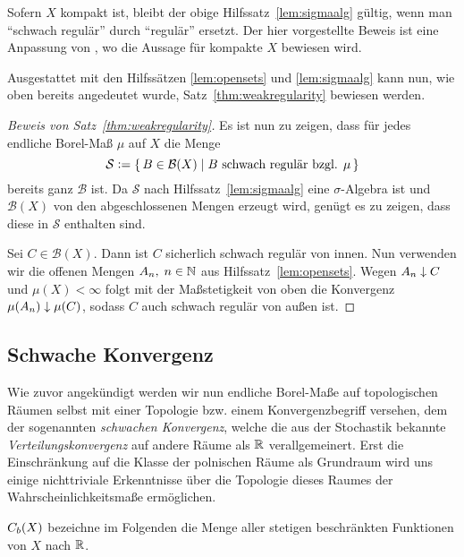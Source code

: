\documentclass[../main/main.tex]{subfiles}
\begin{document}
	\begin{Bemerkung}
		Sofern $X$ kompakt ist, bleibt der obige Hilfssatz~\ref{lem:sigmaalg} 
		gültig, wenn man \enquote{schwach regulär} durch \enquote{regulär} 
		ersetzt. Der hier vorgestellte Beweis ist eine Anpassung von 
		\cite[Lemma 4.5.5]{Simon.2015}, wo die Aussage für kompakte $X$ bewiesen wird.
	\end{Bemerkung}
	
	Ausgestattet mit den Hilfssätzen \ref{lem:opensets} und \ref{lem:sigmaalg} kann nun, 
	wie oben bereits angedeutet wurde, Satz~\ref{thm:weakregularity} bewiesen werden.
	
	\begin{proof}[Beweis von Satz~\ref{thm:weakregularity}]
		Es ist nun zu zeigen, dass für jedes endliche Borel-Maß $\mu$ auf $X$
		die Menge 
		$$\mathcal{S} \vcentcolon = \left\{\, B \in \mathcal{B}(X) \; \middle| \; B \text{ schwach regulär bzgl. } \mu \,\right\}$$
		bereits ganz $\mathcal{B}$ ist. 
		Da $\mathcal{S}$ nach Hilfssatz~\ref{lem:sigmaalg} eine 
		$\sigma$-Algebra ist und 
		$\mathcal{B}(X)$ von den abgeschlossenen Mengen erzeugt wird, genügt es zu zeigen, 
		dass diese in $\mathcal{S}$ enthalten sind. 
		
		Sei $C \in \mathcal{B}(X)$. Dann ist $C$ sicherlich schwach regulär von innen. 
		Nun verwenden wir die offenen Mengen $A_n, \; n \in \mathbb{N}$ aus 
		Hilfssatz~\ref{lem:opensets}. 
		Wegen $A_n \downarrow C$ und $\mu(X) < \infty$ folgt mit der 
		Maßstetigkeit von oben die Konvergenz $\mu(A_n) \downarrow \mu(C)$,
		sodass $C$ auch schwach regulär von außen ist.
	\end{proof}

	\subsection{Schwache Konvergenz}
	
	Wie zuvor angekündigt werden wir nun endliche Borel-Maße auf topologischen Räumen selbst
	mit einer Topologie bzw. einem Konvergenzbegriff versehen, dem der sogenannten \emph{schwachen Konvergenz}, 
	welche die aus der Stochastik bekannte \emph{Verteilungskonvergenz} auf andere Räume als $\mathbb{R}$ verallgemeinert. 
	Erst die Einschränkung auf die Klasse der polnischen Räume als Grundraum wird uns einige nichttriviale Erkenntnisse 
	über die Topologie dieses Raumes der Wahrscheinlichkeitsmaße ermöglichen.
	
	$C_b(X)$ bezeichne 
	im Folgenden die Menge aller stetigen beschränkten Funktionen von $X$ nach $\mathbb{R}$.
	
\end{document}
